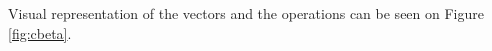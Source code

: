Visual representation of the vectors and the operations can be seen on Figure \ref{fig:cbeta}.







